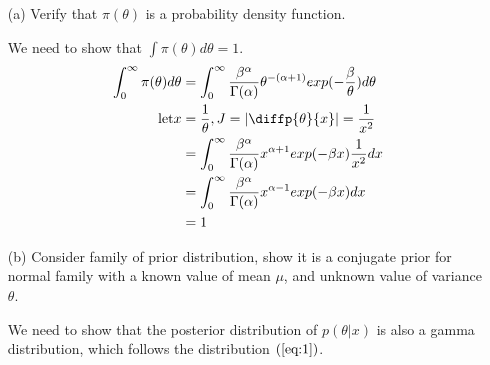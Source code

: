 \documentclass[11pt]{article} %
\begin{document}
\begin{itemize}
	\item [(a)] Verify that $\pi(\theta)$ is a probability density function.
	
	We need to show that $\int \pi(\theta) d\theta = 1$.
	\begin{align*}
	\int_{0}^{\infty}	\pi(\theta) d \theta &= 
		\int_{0}^{\infty}	\frac{\beta^{\alpha} }{\Gamma(\alpha)} \theta^{-(\alpha + 1)} exp(-\frac{\beta}{\theta}) d \theta \\
		\text{let} x &= \frac{1}{\theta}, J = |\diffp{\theta}{x}| = \frac{1}{x^2} \\
		&= \int_{0}^{\infty} \frac{\beta^{\alpha}}{\Gamma(\alpha)} x^{\alpha + 1} exp(-\beta x) \frac{1}{x^2} dx \\
		&= \int_{0}^{\infty} \frac{\beta^{\alpha}}{\Gamma(\alpha)} x^{\alpha -1} exp(-\beta x)  dx \\
		&= 1
	\end{align*}
	
	\item[(b)] Consider family of prior distribution, show it is a conjugate prior for normal family with a known value of mean $\mu$, and unknown value of variance $\theta$. 
	
	 We need to show that the posterior distribution of $p(\theta|x)$ is also a gamma distribution, which follows the distribution $(\ref{eq:1})$.
	 

\end{itemize}
\end{document}
